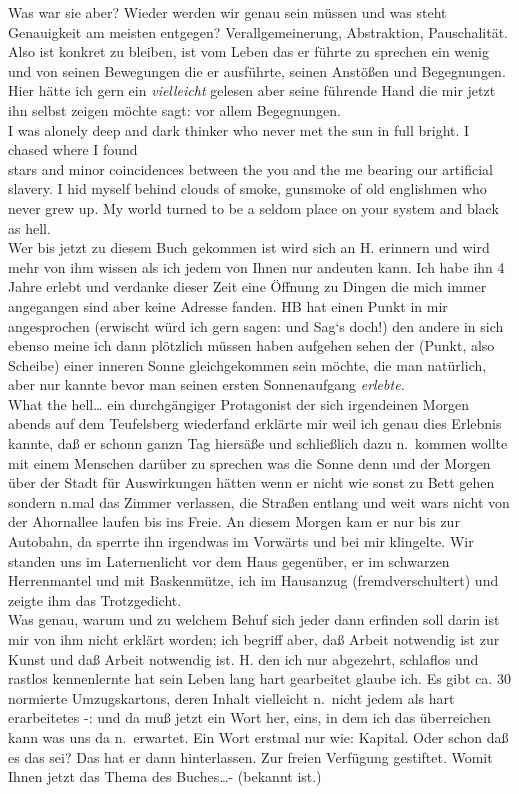 \documentclass[
]{article}
\begin{document}
\begin{enumerate}
  Was war sie aber? Wieder werden wir genau sein müssen und was steht
  Genauigkeit am meisten entgegen? Verallgemeinerung, Abstraktion,
  Pauschalität. Also ist konkret zu bleiben, ist vom Leben das er führte
  zu sprechen ein wenig und von seinen Bewegungen die er ausführte,
  seinen Anstößen und Begegnungen. Hier hätte ich gern ein
  \emph{vielleicht} gelesen aber seine führende Hand die mir jetzt ihn
  selbst zeigen möchte sagt: vor allem Begegnungen.\\
  I was alonely deep and dark thinker who never met the sun in full
  bright. I chased where I found\\
  stars and minor coincidences between the you and the me bearing our
  artificial slavery. I hid myself behind clouds of smoke, gunsmoke of
  old englishmen who never grew up. My world turned to be a seldom place
  on your system and black as hell.\\
  Wer bis jetzt zu diesem Buch gekommen ist wird sich an H. erinnern und
  wird mehr von ihm wissen als ich jedem von Ihnen nur andeuten kann.
  Ich habe ihn 4 Jahre erlebt und verdanke dieser Zeit eine Öffnung zu
  Dingen die mich immer angegangen sind aber keine Adresse fanden. HB
  hat einen Punkt in mir angesprochen (erwischt würd ich gern sagen: und
  Sag`s doch!) den andere in sich ebenso meine ich dann plötzlich müssen
  haben aufgehen sehen der (Punkt, also Scheibe) einer inneren Sonne
  gleichgekommen sein möchte, die man natürlich, aber nur kannte bevor
  man seinen ersten Sonnenaufgang \emph{erlebte.}\\
  What the hell\ldots{} ein durchgängiger Protagonist der sich
  irgendeinen Morgen abends auf dem Teufelsberg wiederfand erklärte mir
  weil ich genau dies Erlebnis kannte, daß er schonn ganzn Tag hiersäße
  und schließlich dazu n.~kommen wollte mit einem Menschen darüber zu
  sprechen was die Sonne denn und der Morgen über der Stadt für
  Auswirkungen hätten wenn er nicht wie sonst zu Bett gehen sondern
  n.mal das Zimmer verlassen, die Straßen entlang und weit wars nicht
  von der Ahornallee laufen bis ins Freie. An diesem Morgen kam er nur
  bis zur Autobahn, da sperrte ihn irgendwas im Vorwärts und bei mir
  klingelte. Wir standen uns im Laternenlicht vor dem Haus gegenüber, er
  im schwarzen Herrenmantel und mit Baskenmütze, ich im Hausanzug
  (fremdverschultert) und zeigte ihm das Trotzgedicht.\\
  Was genau, warum und zu welchem Behuf sich jeder dann erfinden soll
  darin ist mir von ihm nicht erklärt worden; ich begriff aber, daß
  Arbeit notwendig ist zur Kunst und daß Arbeit notwendig ist. H. den
  ich nur abgezehrt, schlaflos und rastlos kennenlernte hat sein Leben
  lang hart gearbeitet glaube ich. Es gibt ca. 30 normierte
  Umzugskartons, deren Inhalt vielleicht n.~nicht jedem als hart
  erarbeitetes -: und da muß jetzt ein Wort her, eins, in dem ich das
  überreichen kann was uns da n.~erwartet. Ein Wort erstmal nur wie:
  Kapital. Oder schon daß es das sei? Das hat er dann hinterlassen. Zur
  freien Verfügung gestiftet. Womit Ihnen jetzt das Thema des
  Buches\ldots- (bekannt ist.)
\end{enumerate}
\end{document}

